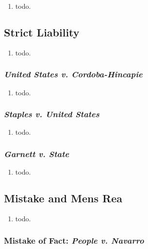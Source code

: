 \begin{enumerate}
    \item todo.
\end{enumerate}

\subsection{Strict Liability}

\begin{enumerate}
    \item todo.
\end{enumerate}

\subsubsection{\emph{United States v. Cordoba-Hincapie}}

\begin{enumerate}
    \item todo.
\end{enumerate}

\subsubsection{\emph{Staples v. United States}}

\begin{enumerate}
    \item todo.
\end{enumerate}

\subsubsection{\emph{Garnett v. State}}

\begin{enumerate}
    \item todo.
\end{enumerate}

\subsection{Mistake and Mens Rea}

\begin{enumerate}
    \item todo.
\end{enumerate}

\subsubsection{Mistake of Fact: \emph{People v. Navarro}}

